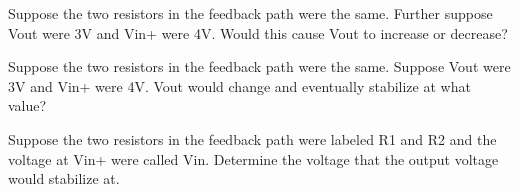 \begin{blevel}
Suppose the two resistors in the feedback path were the same. Further suppose Vout were 3V and Vin+ were 4V. Would this cause Vout to increase or decrease?
\end{blevel}
\begin{blevel}
Suppose the two resistors in the feedback path were the same. Suppose Vout were 3V and Vin+ were 4V. Vout would change and eventually stabilize at what value?
\end{blevel}
\begin{clevel}
Suppose the two resistors in the feedback path were labeled R1 and R2 and the voltage at Vin+ were called Vin. Determine the voltage that the output voltage would stabilize at. 
\end{clevel}

